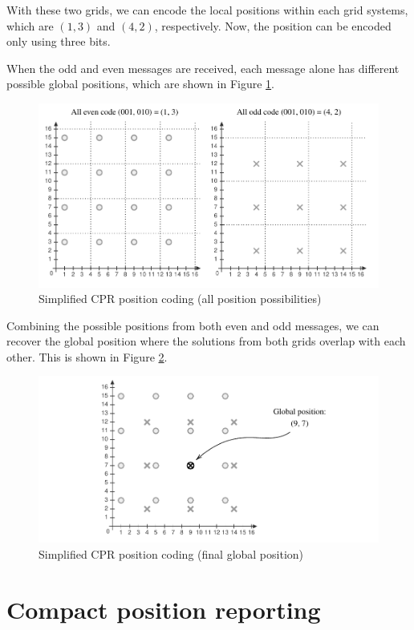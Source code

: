 With these two grids, we can encode the local positions within each grid systems, which are $(1,3)$ and $(4,2)$, respectively. Now, the position can be encoded only using three bits. 

When the odd and even messages are received, each message alone has different possible global positions, which are shown in Figure \ref{fig:cpr_simple_2}.

\begin{figure}[!ht]
  \includegraphics[width=0.9\linewidth]{figures/adsb/cpr_simple_2.pdf}
  \caption{Simplified CPR position coding (all position possibilities)}
  \label{fig:cpr_simple_2}
\end{figure}

Combining the possible positions from both even and odd messages, we can recover the global position where the solutions from both grids overlap with each other. This is shown in Figure \ref{fig:cpr_simple_3}.

\begin{figure}[!ht]
  \includegraphics[width=0.9\linewidth]{figures/adsb/cpr_simple_3.pdf}
  \caption{Simplified CPR position coding (final global position)}
  \label{fig:cpr_simple_3}
\end{figure}

\newpage

\section{Compact position reporting}

